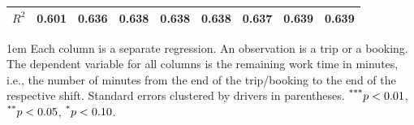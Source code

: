 \documentclass[reviewmode]{restat}
\begin{document}
\begin{appendices}
\begin{table}
{\begin{minipage}{20cm}
{\begin{tabular}{l*{8}{c}}
            \(R^2\)             &     {0.601}         &     {0.636}         &     {0.638}         &     {0.638}         &     {0.638}         &     {0.637}         &     {0.639}         &     {0.639}         \\
            \bottomrule
            \end{tabular}
            }
 			\begin{tablenotes}
 				\parindent 1em%
	        	\small
 				Each column is a separate regression. An observation is a trip or a booking. The dependent variable for all columns is the remaining work time in  minutes, i.e., the number of minutes from the end of the trip/booking to the end of the respective shift. Standard errors clustered by drivers in parentheses. $\textsuperscript{***}p < 0.01$, $\textsuperscript{**}p < 0.05$, $\textsuperscript{*}p < 0.10$.  
 			\end{tablenotes}
 			    \end{minipage}%
    }  %
 	\end{table}



\FloatBarrier

	\begin{table}[h]
	\hspace*{-2pt}
\end{table}
\end{appendices}
\end{document}
